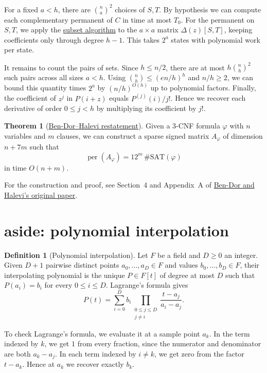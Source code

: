 \documentclass{article}
\theoremstyle{definition}
\newtheorem{definition}[theorem]{Definition}
\DeclareMathOperator{\per}{per}
\newcommand{\BDHstatement}{%
Given a 3-CNF formula \(\varphi\) with \(n\) variables and \(m\) clauses, we can construct a sparse signed matrix \(A_\varphi\) of dimension \(n+7m\) such that
\[
    \per(A_\varphi)=12^m\,\#\mathrm{SAT}(\varphi)
\]
in time \(O(n+m)\).}
\newtheorem{bdhrestatement}[theorem]{Theorem}
\begin{document}
For a fixed \(a<h\), there are \(\binom na^2\) choices of \(S,T\).
By hypothesis we can compute each complementary permanent of \(C\)
in time at most \(T_0\). For the permanent on \(S,T\), we apply the
\hyperref[alg:subset-permanent]{subset algorithm} to the \(a\times a\)
matrix \(\Delta(z)[S,T]\), keeping coefficients only through degree
\(h-1\). This takes \(2^a\) states with polynomial work per state.

It remains to count the pairs of sets. Since \(h\le n/2\), there are
at most \(h\binom nh^2\) such pairs across all sizes \(a<h\).
Using \(\binom nh\le(en/h)^h\) and \(n/h\ge2\), we can bound this
quantity times \(2^a\) by \((n/h)^{O(h)}\) up to polynomial factors.
Finally, the coefficient of \(z^j\) in \(P(i+z)\) equals
\(P^{(j)}(i)/j!\). Hence we recover each derivative of order
\(0\le j<h\) by multiplying its coefficient by \(j!\).

\begin{bdhrestatement}[{\hyperref[thm:bdh]{Ben-Dor--Halevi restatement}}]\label{thm:bdh-restated}
\BDHstatement
\end{bdhrestatement}

For the construction and proof, see Section~4 and Appendix~A of
\href{https://people.csail.mit.edu/shaih/pubs/01perm.pdf#page=6}{Ben-Dor and Halevi's original paper}.

\section{aside: polynomial interpolation}

\begin{definition}[Polynomial interpolation]\label{def:interpolation}
Let \(F\) be a field and \(D\ge 0\) an integer. Given \(D+1\) pairwise
distinct points \(a_0,\ldots,a_D\in F\) and values \(b_0,\ldots,b_D\in F\),
their interpolating polynomial is the unique \(P\in F[t]\) of degree at most
\(D\) such that \(P(a_i)=b_i\) for every \(0\le i\le D\).
Lagrange's formula gives
\[
    P(t)=\sum_{i=0}^{D} b_i
    \prod_{\substack{0\le j\le D\\j\ne i}}\frac{t-a_j}{a_i-a_j}.
\]
\end{definition}

To check Lagrange's formula, we evaluate it at a sample point \(a_k\).
In the term indexed by \(k\), we get \(1\) from every fraction, since
the numerator and denominator are both \(a_k-a_j\). In each term
indexed by \(i\ne k\), we get zero from the factor \(t-a_k\).
Hence at \(a_k\) we recover exactly \(b_k\).
\end{document}
